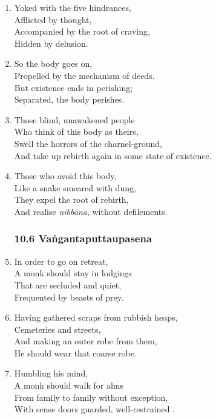 \documentclass[10pt, openany]{book}
\begin{document}
\begin{enumerate}
\item Yoked with the five hindrances,\\
Afflicted by thought,\\
Accompanied by the root of craving,\\
Hidden by delusion.

\item So the body goes on,\\
Propelled by the mechanism of deeds.\\
But existence ends in perishing;\\
Separated, the body perishes.

\item Those blind, unawakened people\\
Who think of this body as theirs,\\
Swell the horrors of the charnel-ground,\\
And take up rebirth again in some state of existence.

\item Those who avoid this body,\\
Like a snake smeared with dung,\\
They expel the root of rebirth,\\
And realise \emph{nibbāna}, without defilements.

\subsubsection*{10.6 Vaṅgantaputtaupasena}

\item In order to go on retreat,\\
A monk should stay in lodgings\\
That are secluded and quiet,\\
Frequented by beasts of prey.

\item Having gathered scraps from rubbish heaps,\\
Cemeteries and streets,\\
And making an outer robe from them,\\
He should wear that coarse robe.

\item Humbling his mind,\\
A monk should walk for alms\\
From family to family without exception,\\
With sense doors guarded, well-restrained .


\end{enumerate}
\end{document}
